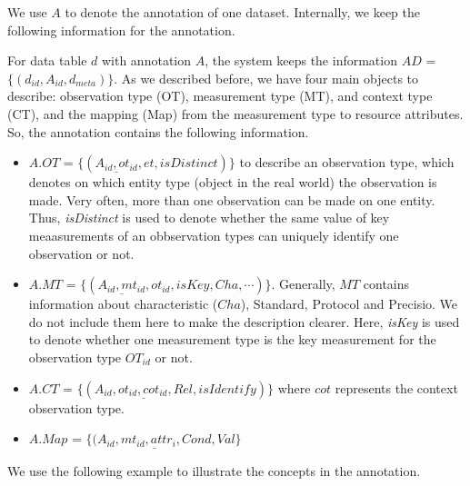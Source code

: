 \documentclass[conference]{IEEEtran}
\begin{document}

We use $A$ to denote the annotation of one dataset. 
Internally, we keep the following information for the
annotation. 

For data table $d$ with annotation $A$, the system keeps the
information $AD$ = $\{(d_{id}, A_{id}, d_{meta})\}$.
As we described before, we have four main objects to describe: 
observation type (OT), measurement type (MT), and
context type (CT), and the mapping (Map) from the measurement type to
resource attributes.  
So, the annotation contains the following information. 

\begin{itemize}
\item $A.OT$ = $\{(\underline{A_{id},ot_{id}}, et, isDistinct)\}$ to
  describe an observation type, which denotes on which
  entity type (object in the real world) the observation is made. 
Very often, more than one observation can be made on one entity. Thus,{\em
  isDistinct} is used to denote whether the same value of key
meaasurements of an obbservation types can uniquely identify one
observation or not. 
\item $A.MT$ = $\{(\underline{A_{id}, mt_{id}}, ot_{id},isKey,
  Cha, \cdots)\}$. Generally, $MT$ contains information about
  characteristic ($Cha$), Standard, Protocol and Precisio. We do not include them
  here to make the description clearer. Here, {\em isKey} is used to denote
  whether one measurement type is the key measurement for the
  observation type $OT_{id}$ or not. 
\item $A.CT$ = $\{(\underline{A_{id}, ot_{id}, cot_{id},
  Rel}, isIdentify)\}$ where $cot$ represents the context observation
  type. 
\item $A.Map$ = $\{(\underline{A_{id},mt_{id}, attr_i, Cond},
  Val\}$
\end{itemize}

We use the following example to illustrate the concepts in the
annotation. 
\end{document}
